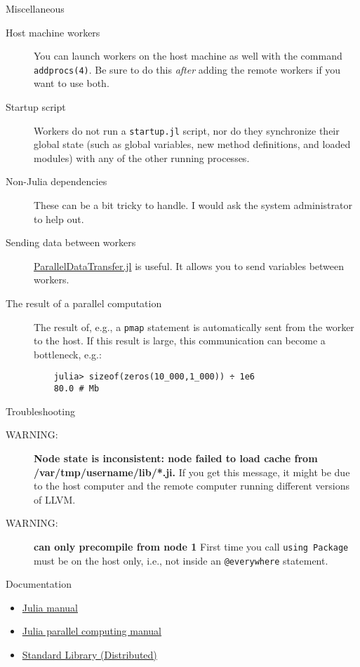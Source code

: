 \documentclass{beamer}
\begin{document}
\begin{frame}[fragile]{Miscellaneous}
    \begin{description}
	\item[Host machine workers] You can launch workers on the host machine as well with the command \texttt{addprocs(4)}. Be sure to do this \emph{after} adding the remote workers if you want to use both.
	\item[Startup script] Workers do not run a \texttt{startup.jl} script, nor do they synchronize their global state (such as global variables, new method definitions, and loaded modules) with any of the other running processes.
	\item[Non-Julia dependencies] These can be a bit tricky to handle. I would ask the system administrator to help out.
	\item[Sending data between workers] \href{https://github.com/ChrisRackauckas/ParallelDataTransfer.jl}{ParallelDataTransfer.jl} is useful. It allows you to send variables between workers.
	\item[The result of a parallel computation] The result of, e.g., a \texttt{pmap} statement is automatically sent from the worker to the host. If this result is large, this communication can become a bottleneck, e.g.:
	\begin{verbatim}
	julia> sizeof(zeros(10_000,1_000)) ÷ 1e6
	80.0 # Mb
	\end{verbatim}

\end{description}

\end{frame}


\begin{frame}{Troubleshooting}
\begin{description}
	\item[WARNING:] \textbf{Node state is inconsistent: node failed to load cache from /var/tmp/username/lib/*.ji.} If you get this message, it might be due to the host computer and the remote computer running different versions of LLVM.
	\item[WARNING:] \textbf{can only precompile from node 1} First time you call \texttt{using Package} must be on the host only, i.e., not inside an \texttt{@everywhere} statement.
\end{description}

\end{frame}


\begin{frame}{Documentation}
\begin{itemize}
	\item \href{https://docs.julialang.org/en/v1/}{Julia manual}
	\item \href{https://docs.julialang.org/en/v1/manual/parallel-computing/}{Julia parallel computing manual}
	\item \href{https://docs.julialang.org/en/v1/stdlib/Distributed/}{Standard Library (Distributed)}
\end{itemize}


\end{frame}
\end{document}
